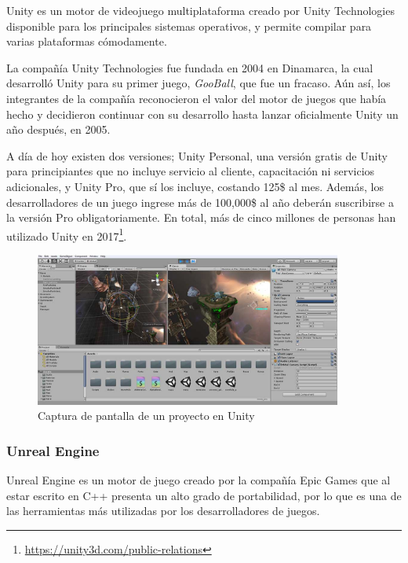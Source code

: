 Unity es un motor de videojuego multiplataforma creado por Unity Technologies disponible para los principales sistemas operativos, y permite compilar para varias plataformas cómodamente. 

La compañía Unity Technologies fue fundada en 2004 en Dinamarca, la cual desarrolló Unity para su primer juego, \textit{GooBall}, que fue un fracaso. Aún así, los integrantes de la compañía reconocieron el valor del motor de juegos que había hecho y decidieron continuar con su desarrollo hasta lanzar oficialmente Unity un año después, en 2005.  

A día de hoy existen dos versiones; Unity Personal, una versión gratis de Unity para principiantes que no incluye servicio al cliente, capacitación ni servicios adicionales, y Unity Pro, que sí los incluye, costando 125\$ al mes. Además, los desarrolladores de un juego ingrese más de 100,000\$ al año deberán suscribirse a la versión Pro obligatoriamente. En total, más de cinco millones de personas han utilizado Unity en 2017\footnote{\url{https://unity3d.com/public-relations}}.

\begin{figure}[!h]
\begin{center}
\includegraphics[width=0.9\textwidth]{imagenes/2/unity.jpg}
\caption{Captura de pantalla de un proyecto en Unity}
\label{fig:unity}
\end{center}
\end{figure}


\subsubsection{Unreal Engine}

Unreal Engine es un motor de juego creado por la compañía Epic Games que al estar escrito en C++ presenta un alto grado de portabilidad, por lo que es una de las herramientas más utilizadas por los desarrolladores de juegos.


